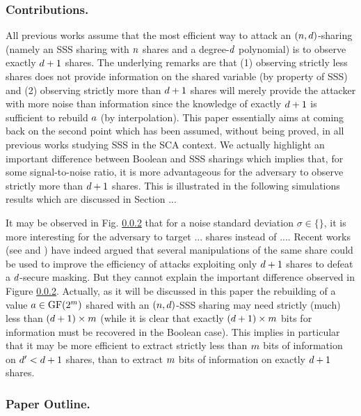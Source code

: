 \documentclass{llncs}
\begin{document}
\subsubsection{Contributions.} All previous works assume that the most efficient way to attack an $(n,d)$-sharing (namely an SSS sharing with $n$ shares and a degree-$d$ polynomial) is to observe exactly $d +1$ shares. The underlying remarks are that (1) observing strictly less shares does not provide information on the shared variable (by property of SSS) and (2) observing strictly more than $d +1$ shares will merely provide the attacker with more noise than information since the knowledge of exactly $d +1$ is sufficient to rebuild $a$ (by interpolation). This paper essentially aims at coming back on the second point which has been assumed, without being proved, in all previous works studying SSS in the SCA context. We actually highlight an important difference between Boolean and SSS sharings which implies that, for some signal-to-noise ratio, it is more advantageous for the adversary to observe strictly more than $d+1$ shares. This is illustrated in the following simulations results which are discussed in Section ...
 \todo{}

It may be observed in Fig. \ref{} that for a noise standard deviation $\sigma \in \{\}$, it is more interesting for the adversary to target ... shares instead of ....  Recent works (see \eg \cite{BCPZ16} and \cite{}) have indeed argued that several manipulations of the same share could be used to improve the efficiency of attacks exploiting only $d +1$ shares to defeat a $d$-secure masking. But they cannot explain the important difference observed in Figure \ref{}. Actually, as it will be discussed in this paper the rebuilding of a value $a\in \mathrm{GF}(2^{{m}})$ shared with an $(n,d)$-SSS sharing may need strictly (much) less than $(d+1) \times {m}$ (while it is clear that exactly $(d + 1)\times {m}$ bits for information must be recovered in the Boolean case). This implies in particular that it may be more efficient to extract strictly less than ${m}$ bits of information on $d'<d +1$ shares, than to extract ${m}$ bits of information on exactly $d + 1$ shares. 

\subsubsection{Paper Outline.}
\end{document}
